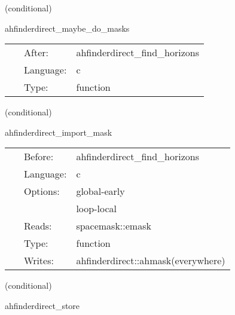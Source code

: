 \vspace{5mm}

   (conditional) 

\hspace{5mm} ahfinderdirect\_maybe\_do\_masks 

\hspace{5mm}{\it set mask(s) based on apparent horizon position(s) } 


\hspace{5mm}

 \begin{tabular*}{160mm}{cll} 
~ & After:  & ahfinderdirect\_find\_horizons \\ 
~ & Language:  & c \\ 
~ & Type:  & function \\ 
\end{tabular*} 


\vspace{5mm}

   (conditional) 

\hspace{5mm} ahfinderdirect\_import\_mask 

\hspace{5mm}{\it import the excision mask } 


\hspace{5mm}

 \begin{tabular*}{160mm}{cll} 
~ & Before:  & ahfinderdirect\_find\_horizons \\ 
~ & Language:  & c \\ 
~ & Options:  & global-early \\ 
~& ~ &loop-local\\ 
~ & Reads:  & spacemask::emask \\ 
~ & Type:  & function \\ 
~ & Writes:  & ahfinderdirect::ahmask(everywhere) \\ 
\end{tabular*} 


\vspace{5mm}

   (conditional) 

\hspace{5mm} ahfinderdirect\_store 

\hspace{5mm}{\it store apparent horizon(s) into spherical surface(s) } 



